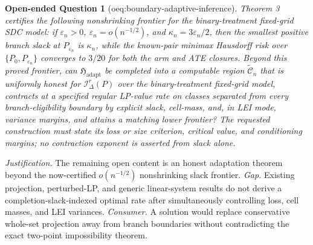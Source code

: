 \documentclass{article}
\newtheorem{openendedquestion}{Open-ended Question}
\begin{document}
\begin{openendedquestion}[oeq:boundary-adaptive-inference]\label{oeq:boundary-adaptive-inference}
Theorem 3 certifies the following nonshrinking frontier for the binary-treatment fixed-grid SDC model: if \(\varepsilon_n>0\), \(\varepsilon_n=o(n^{-1/2})\), and \(\kappa_n=3\varepsilon_n/2\), then the smallest positive branch slack at \(P_{\varepsilon_n}\) is \(\kappa_n\), while the known-pair minimax Hausdorff risk over \(\{P_0,P_{\varepsilon_n}\}\) converges to \(3/20\) for both the arm and ATE closures.  Beyond this proved frontier, can \(\mathfrak H_{\mathrm{adapt}}\) be completed into a computable region \(\widetilde{\mathcal C}_n\) that is uniformly honest for \(\mathcal I_\Delta^r(P)\) over the binary-treatment fixed-grid model, contracts at a specified regular LP-value rate on classes separated from every branch-eligibility boundary by explicit slack, cell-mass, and, in LEI mode, variance margins, and attains a matching lower frontier?  The requested construction must state its loss or size criterion, critical value, and conditioning margins; no contraction exponent is asserted from slack alone.
\end{openendedquestion}
\par\smallskip\noindent \textit{Justification.} The remaining open content is an honest adaptation theorem beyond the now-certified \(o(n^{-1/2})\) nonshrinking slack frontier. \textit{Gap.} Existing projection, perturbed-LP, and generic linear-system results do not derive a completion-slack-indexed optimal rate after simultaneously controlling loss, cell masses, and LEI variances. \textit{Consumer.} A solution would replace conservative whole-set projection away from branch boundaries without contradicting the exact two-point impossibility theorem.
\end{document}
